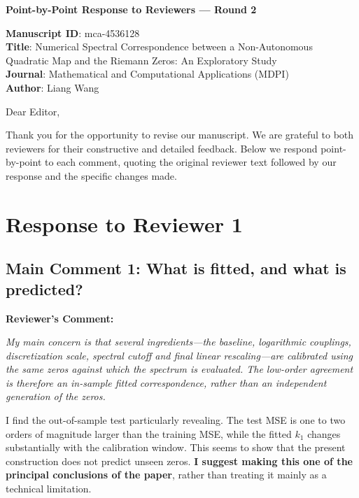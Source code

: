 \documentclass[11pt]{article}
\begin{document}
\begin{center}
\textbf{\Large Point-by-Point Response to Reviewers --- Round 2}
\end{center}

\vspace{0.3cm}

\noindent \textbf{Manuscript ID}: mca-4536128\\
\textbf{Title}: Numerical Spectral Correspondence between a Non-Autonomous Quadratic Map and the Riemann Zeros: An Exploratory Study\\
\textbf{Journal}: Mathematical and Computational Applications (MDPI)\\
\textbf{Author}: Liang Wang

\vspace{0.5cm}

\noindent Dear Editor,

Thank you for the opportunity to revise our manuscript. We are grateful to both reviewers for their constructive and detailed feedback. Below we respond point-by-point to each comment, quoting the original reviewer text followed by our response and the specific changes made.

\section*{Response to Reviewer 1}

\subsection*{Main Comment 1: What is fitted, and what is predicted?}

\noindent\textbf{Reviewer's Comment:}
\begin{quotebox}
\itshape My main concern is that several ingredients---the baseline, logarithmic couplings, discretization scale, spectral cutoff and final linear rescaling---are calibrated using the same zeros against which the spectrum is evaluated. The low-order agreement is therefore an in-sample fitted correspondence, rather than an independent generation of the zeros.

I find the out-of-sample test particularly revealing. The test MSE is one to two orders of magnitude larger than the training MSE, while the fitted $k_1$ changes substantially with the calibration window. This seems to show that the present construction does not predict unseen zeros. \textbf{I suggest making this one of the principal conclusions of the paper}, rather than treating it mainly as a technical limitation.
\end{quotebox}
\end{document}
